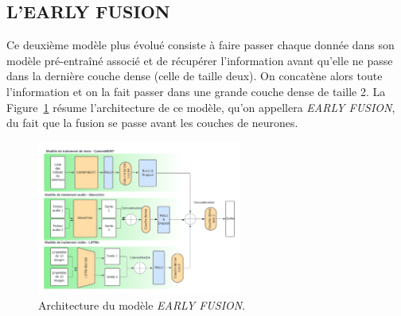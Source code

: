 \subsection{L'EARLY FUSION}
Ce deuxième modèle plus évolué consiste à faire passer chaque donnée dans son modèle pré-entraîné associé et de récupérer
l'information avant qu'elle ne passe dans la dernière couche dense (celle de taille deux). On concatène alors toute l'information 
et on la fait passer dans une grande couche dense de taille 2.
La Figure~\ref{fig: EARLY FUSION} résume l'architecture de ce modèle, qu'on appellera \textit{EARLY FUSION}, du fait que la fusion
se passe avant les couches de neurones.

\begin{figure}[H]
    \centering
    \includegraphics[width=0.6\textwidth]{image_model/early_fusion.png}
    \caption{Architecture du modèle \textit{EARLY FUSION}.}
    \label{fig: EARLY FUSION}
\end{figure}